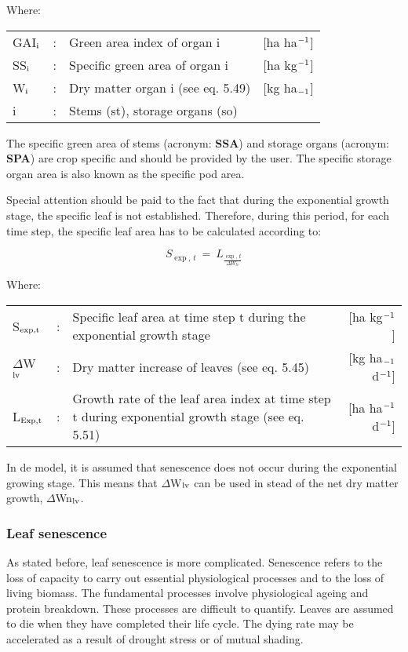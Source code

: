 Where:\\
\begin{tabularx}{\textwidth}{llXr}
GAI$_{{\rm i}}$ &:& Green area index of organ i    &
    [ha ha$^{{\rm -1}}$]\\
SS$_{{\rm i}}$ &:& Specific green area of organ i    &
    [ha kg$^{{\rm -1}}$]\\
W$_{{\rm i}}$ &:& Dry matter organ i (see eq. 5.49)    &
    [kg ha$_{{\rm -1}}$]\\
i &:& Stems (st), storage organs (so)\\
\end{tabularx}

The specific green area of stems (acronym: {\bf SSA}) and storage organs (acronym: {\bf SPA}) are
crop specific and should be provided by the user. The specific storage organ area is also
known as the specific pod area.

Special attention should be paid to the fact that during the exponential growth stage, the
specific leaf is not established. Therefore, during this period, for each time step, the
specific leaf area has to be calculated according to:

\begin{equation}
S _{\exp ,\, t} ~=~L _{\frac{\exp ,\, t}{\Delta W _{lv} }}
\end{equation}

Where:\\
\begin{tabularx}{\textwidth}{llXr}
S$_{{\rm exp,t}}$ &:& Specific leaf area at time step t during the 
    exponential growth stage    &     [ha kg$^{{\rm -1}}$]\\
$\Delta$W$_{{\rm lv}}$ &:& Dry matter increase of leaves (see eq. 5.45)   &
    [kg ha$_{{\rm -1}}$ d$^{{\rm -1}}$]\\
L$_{{\rm Exp,t}}$ &:& Growth rate of the leaf area index at time step t
   during exponential growth stage (see eq. 5.51)   &
        [ha ha$^{{\rm -1}}$ d$^{{\rm -1}}$]\\
\end{tabularx}

 
In de model, it is assumed that senescence does not occur during the exponential growing
stage. This means that $\Delta$W$_{{\rm lv}}$ can be used in stead of the net dry matter growth, $\Delta$Wn$_{{\rm lv}}$.

\subsubsection{Leaf senescence}
As stated before, leaf senescence is more complicated. Senescence refers to the loss of
capacity to carry out essential physio\-logical processes and to the loss of living biomass.
The fundamental processes involve physiological ageing and protein breakdown. These
processes are difficult to quantify. Leaves are assumed to die when they have completed
their life cycle. The dying rate may be accelerated as a result of drought stress or of
mutual shading.

